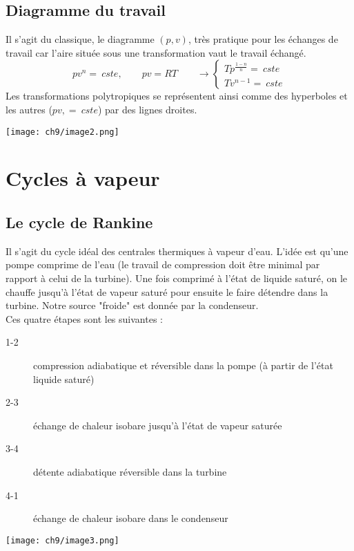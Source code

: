 	\subsection{Diagramme du travail}
	Il s'agit du classique, le diagramme $(p,v)$, très pratique pour les échanges de 
	travail car l'aire située sous une transformation vaut le travail échangé. 
	\begin{equation}
	pv^n=\ cste,\qquad pv = RT\qquad \rightarrow \left\{\begin{array}{ll}
	Tp^{\frac{1-n}{n}}=\ cste\\
	Tv^{n-1}=\ cste	
	\end{array}\right.
	\end{equation}		
	Les transformations polytropiques se représentent ainsi comme des hyperboles 
	et les autres ($pv,=\ cste$) par des lignes droites.
	\begin{center}
	\texttt{[image: ch9/image2.png]}
	\end{center}	
	
	
	
\section{Cycles à vapeur}
	\subsection{Le cycle de Rankine}		
	Il s'agit du cycle idéal des centrales thermiques à vapeur d'eau. L'idée est 
	qu'une pompe comprime de l'eau (le travail de compression doit être minimal 
	par rapport à celui de la turbine). Une fois comprimé à l'état de liquide 
	saturé, on le chauffe jusqu'à l'état de vapeur saturé pour ensuite le faire 
	détendre dans la turbine. Notre source "froide" est donnée par la condenseur.\\
	Ces quatre étapes sont les suivantes :
	\begin{description}
	\item[1-2] compression adiabatique et réversible dans la pompe (à partir de 
	l'état liquide saturé)
	\item[2-3] échange de chaleur isobare jusqu'à l'état de vapeur saturée
	\item[3-4] détente adiabatique réversible dans la turbine
	\item[4-1] échange de chaleur isobare dans le condenseur
	\end{description}
	\begin{center}
	\texttt{[image: ch9/image3.png]}
	\end{center}


